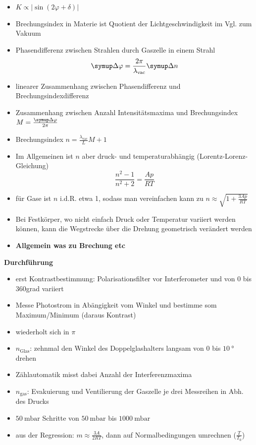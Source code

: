 \begin{itemize}
    \item $K\propto |\sin(2\varphi+\delta)|$
    \item Brechungsindex in Materie ist Quotient der Lichtgeschwindigkeit im Vgl. zum Vakuum
    \item Phasendifferenz zwischen Strahlen durch Gaszelle in einem Strahl
        \begin{equation}
            \upD\varphi = \frac{2\pi}{\lambda_\text{vac}}\upD n
        \end{equation}
    \item linearer Zusammenhang zwischen Phasendifferenz und Brechungsindexdifferenz
    \item Zusammenhang zwischen Anzahl Intensitätsmaxima und Brechungsindex $M = \frac{\upD\varphi}{2\pi}$
    \item Brechungsindex $n = \frac{\lambda_\text{vac}}{L}M +1$
    \item Im Allgemeinen ist $n$ aber druck- und temperaturabhängig (Lorentz-Lorenz-Gleichung)
        \begin{equation}
            \frac{n^2-1}{n^2+2} = \frac{Ap}{RT}
        \end{equation}
    \item für Gase ist $n$ i.d.R. etwa 1, sodass man vereinfachen kann zu $n\approx \sqrt{1+\frac{3Ap}{RT}}$
    \item Bei Festkörper, wo nicht einfach Druck oder Temperatur variiert werden können, kann die Wegstrecke über die Drehung geometrisch verändert werden
    \item \textbf{Allgemein was zu Brechung etc}
\end{itemize}

\textbf{Durchführung}
\begin{itemize}
    \item erst Kontrastbestimmung: Polarisationsfilter vor Interferometer und von 0 bis 360grad variiert
    \item Messe Photostrom in Abängigkeit vom Winkel und bestimme som Maximum/Minimum (daraus Kontrast)
    \item wiederholt sich in $\pi$
    \item $n_\text{Glas}$: zehnmal den Winkel des Doppelglashalters langsam von 0 bis $\SI{10}{\degree}$ drehen
    \item Zählautomatik misst dabei Anzahl der Interferenzmaxima
    \item $n_\text{gas}$: Evakuierung und Ventilierung der Gaszelle je drei Messreihen in Abh. des Drucks
    \item $\SI{50}{\milli\bar}$ Schritte von $\SI{50}{\milli\bar}$ bis $\SI{1000}{\milli\bar}$
    \item aus der Regression: $m\approx\frac{3A}{2RT}$, dann auf Normalbedingungen umrechnen ($\frac{T}{T_0}$)
\end{itemize}
